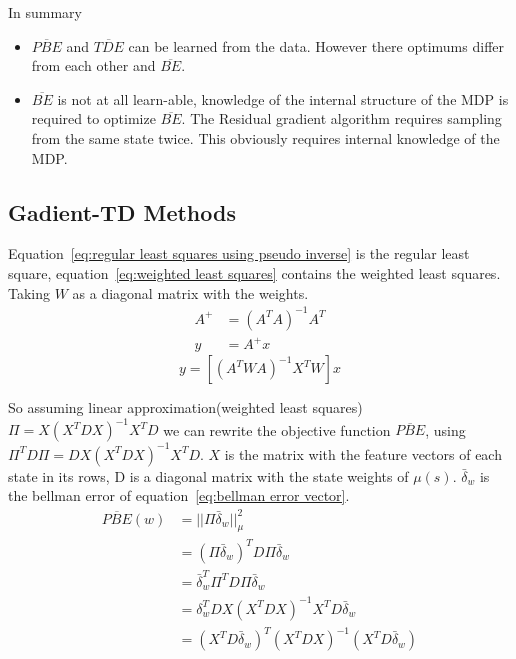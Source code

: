 In summary
\begin{itemize}
	\item $\overline{PBE}$ and $\overline{TDE}$ can be learned from the data. However there optimums differ from each other and $\overline{BE}$.
	\item $\overline{BE}$ is not at all learn-able, knowledge of the internal structure of the MDP is required to optimize $\overline{BE}$. The Residual gradient algorithm requires sampling from the same state twice. This obviously requires internal knowledge of the MDP.
\end{itemize}

\subsection{Gadient-TD Methods}
Equation~\ref{eq:regular least squares using pseudo inverse} is the regular least square, equation~\ref{eq:weighted least squares} contains the weighted least squares. Taking $W$ as a diagonal matrix with the weights. 
\begin{equation}
\begin{split}
A^+ & = (A^T A)^{-1}A^T \\
y & = A^+x
\end{split}
\label{eq:regular least squares using pseudo inverse}
\end{equation}
\begin{equation}
y = [(A^TWA)^{-1}X^TW]x
\label{eq:weighted least squares} 
\end{equation}

So assuming linear approximation(weighted least squares) $\Pi=X(X^TDX)^{-1}X^TD$ we can rewrite the objective function $\overline{PBE}$, using $\Pi^TD\Pi=DX(X^TDX)^{-1}X^TD$. $X$ is the matrix with the feature vectors of each state in its rows, D is a diagonal matrix with the state weights of $\mu(s)$. $\bar{\delta}_w$ is the bellman error of equation~\ref{eq:bellman error vector}.
\begin{equation}
\begin{split}
\overline{PBE}(w) & = ||\Pi\bar{\delta}_w||^2_\mu \\
& = (\Pi\bar{\delta}_w)^TD\Pi\bar{\delta}_w \\
& = \bar{\delta}^T_w\Pi^TD\Pi\bar{\delta}_w \\
& = \delta_w^TDX(X^TDX)^{-1}X^TD\bar{\delta}_w \\
& = (X^TD\bar{\delta}_w)^T(X^TDX)^{-1}(X^TD\bar{\delta}_w)
\end{split}
\end{equation}

